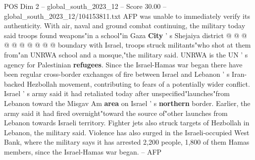\begin{textsample}{POS Dim 2 – global\_south\_2023\_12 – Score 30.00 – global\_south\_2023\_12/104153811.txt}
AFP was unable to immediately verify its authenticity.
With air, naval and ground combat continuing, the military today said troops found weapons"in a school"in Gaza \textbf{City} ' s Shejaiya district @ @ @ @ @ @ @ @ @ @ boundary with Israel, troops struck militants"who shot at them from"an UNRWA school and a mosque,"the military said.
UNRWA is the UN ' s agency for Palestinian \textbf{refugees}.
Since the Israel-Hamas war began there have been regular cross-border exchanges of fire between Israel and Lebanon ' s Iran-backed Hezbollah movement, contributing to fears of a potentially wider conflict.
Israel ' s army said it had retaliated today after unspecified"launches"from Lebanon toward the Misgav Am \textbf{area} on Israel ' s \textbf{northern} border.
Earlier, the army said it had fired overnight"toward the source of"other launches from Lebanon towards Israeli territory.
Fighter jets also struck targets of Hezbollah in Lebanon, the military said.
Violence has also surged in the Israeli-occupied West Bank, where the military says it has arrested 2,200 people, 1,800 of them Hamas members, since the Israel-Hamas war began. -- AFP

\end{textsample}
